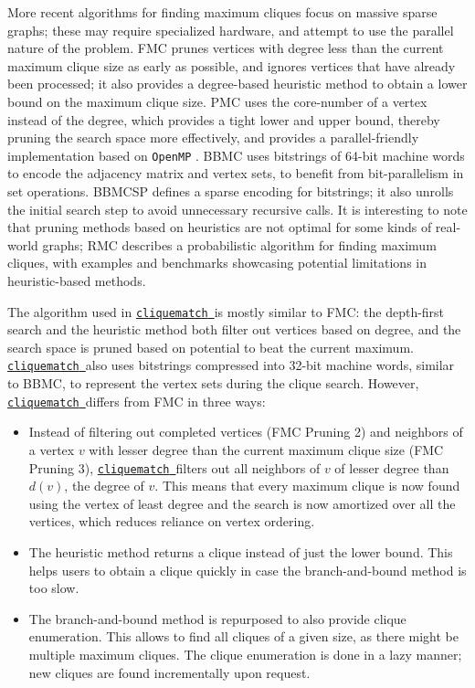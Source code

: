 \documentclass[12pt]{article}
\newcommand{\clqm}{\href{https://github.com/ahgamut/cliquematch}{\texttt{cliquematch}~}}
\begin{document}
More recent algorithms for finding maximum cliques focus on massive sparse graphs; these
may require specialized hardware, and attempt to use the parallel nature of the problem.
FMC \citep{pattabiraman2015} prunes vertices with degree less than the current maximum
clique size as early as possible, and ignores vertices that have already been processed;
it also provides a degree-based heuristic method to obtain a lower bound on the maximum
clique size. PMC \citep{rossi2015} uses the core-number \citep{seidman1983network} of
a vertex instead of the degree, which provides a tight lower and upper bound, thereby
pruning the search space more effectively, and provides a parallel-friendly
implementation based on \texttt{OpenMP} \citep{openmp1998}.  BBMC
\citep{segundo2011} uses bitstrings of 64-bit machine words to encode the adjacency
matrix and vertex sets, to benefit from bit-parallelism in set operations. BBMCSP
\citep{segundo2016} defines a sparse encoding for bitstrings; it also unrolls the
initial search step to avoid unnecessary recursive calls. It is interesting to note that
pruning methods based on heuristics are not optimal for some kinds of real-world graphs;
RMC \citep{lu2017} describes a probabilistic algorithm for finding maximum
cliques, with examples and benchmarks showcasing potential limitations in heuristic-based
methods.

The algorithm used in \clqm is mostly similar to FMC: the depth-first search and the
heuristic method both filter out vertices based on degree, and the search space is pruned
based on potential to beat the current maximum. \clqm also uses bitstrings compressed
into 32-bit machine words, similar to BBMC, to represent the vertex sets during the
clique search. However, \clqm differs from FMC in three ways:

\begin{itemize}
	\item Instead of filtering out completed vertices (FMC Pruning 2) and neighbors of a vertex
	      $v$ with lesser degree than the current maximum clique size (FMC
	      Pruning 3), \clqm filters out all neighbors of $v$ of lesser degree
	      than $d(v)$, the degree of $v$.  This means that every
	      maximum clique is now found using the vertex of least degree and the search is now
	      amortized over all the vertices, which reduces reliance on vertex ordering.
	\item The heuristic method returns a clique instead of just the lower bound. This helps users
	      to obtain a clique quickly in case the branch-and-bound method is too slow.
	\item The branch-and-bound method is repurposed to also provide clique enumeration. This allows
	      to find all cliques of a given size, as there might be multiple maximum cliques. The
	      clique enumeration is done in a lazy manner; new cliques are found incrementally upon
	      request.
\end{itemize}
\end{document}
